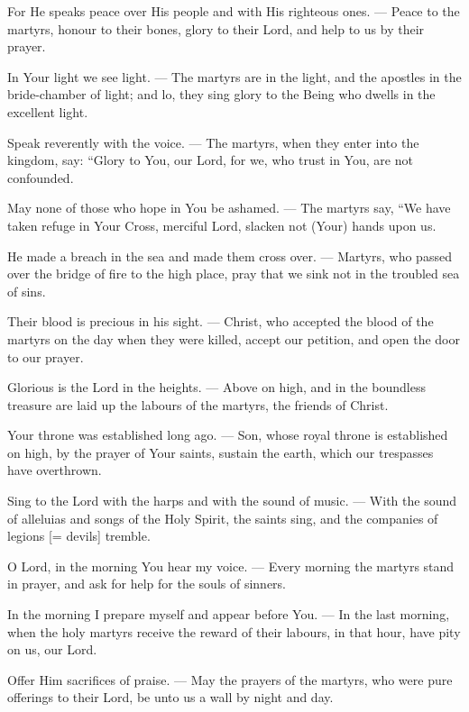 \documentclass[12pt,twoside,a5paper]{article}
\begin{document}

\begin{halfparskip}
  For He speaks peace over His people and with His righteous ones. --- Peace to the martyrs, honour to their bones, glory to their Lord, and help to us by their prayer.

  In Your light we see light. --- The martyrs are in the light, and the apostles in the bride-chamber of light; and lo, they sing glory to the Being who dwells in the excellent light.

  Speak reverently with the voice. --- The martyrs, when they enter into the kingdom, say: ``Glory to You, our Lord, for we, who trust in You, are not confounded.

  May none of those who hope in You be ashamed. --- The martyrs say, ``We have taken refuge in Your Cross, merciful Lord, slacken not (Your) hands upon us.

  He made a breach in the sea and made them cross over. --- Martyrs, who passed over the bridge of fire to the high place, pray that we sink not in the troubled sea of sins.

  Their blood is precious in his sight. --- Christ, who accepted the blood of the martyrs on the day when they were killed, accept our petition, and open the door to our prayer.

  Glorious is the Lord in the heights. --- Above on high, and in the boundless treasure are laid up the labours of the martyrs, the friends of Christ.

  Your throne was established long ago. --- Son, whose royal throne is established on high, by the prayer of Your saints, sustain the earth, which our trespasses have overthrown.

  Sing to the Lord with the harps and with the sound of music. --- With the sound of alleluias and songs of the Holy Spirit, the saints sing, and the companies of legions [= devils] tremble.

  O Lord, in the morning You hear my voice. --- Every morning the martyrs stand in prayer, and ask for help for the souls of sinners.

  In the morning I prepare myself and appear before You. --- In the last morning, when the holy martyrs receive the reward of their labours, in that hour, have pity on us, our Lord.

  Offer Him sacrifices of praise. --- May the prayers of the martyrs, who were pure offerings to their Lord, be unto us a wall by night and day.


\end{halfparskip}
\end{document}
